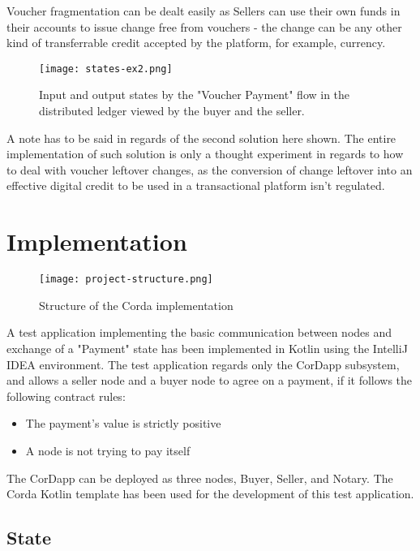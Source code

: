 Voucher fragmentation can be dealt easily as Sellers can use their own funds in their accounts to issue change free from vouchers - the change can be any other kind of transferrable credit accepted by the platform, for example, currency.

\begin{figure}[h!]
    \centering
    \texttt{[image: states-ex2.png]}
    \caption{
       Input and output states by the "Voucher Payment" flow in the distributed ledger viewed by the buyer and the seller.
        }
\end{figure}

A note has to be said in regards of the second solution here shown. The entire implementation of such solution is only a thought experiment in regards to how to deal with voucher leftover changes, as the conversion of change leftover into an effective digital credit to be used in a transactional platform isn't regulated.


\section{Implementation}

\begin{figure}[h!]
    \centering
    \texttt{[image: project-structure.png]}
    \caption{
       Structure of the Corda implementation
        }
\end{figure}

A test application implementing the basic communication between nodes and exchange of a "Payment" state has been implemented in Kotlin using the IntelliJ IDEA environment. The test application regards only the CorDapp subsystem, and allows a seller node and a buyer node to agree on a payment, if it follows the following contract rules: 

\begin{itemize}
    \item The payment's value is strictly positive
    \item A node is not trying to pay itself
\end{itemize}

The CorDapp can be deployed as three nodes, Buyer, Seller, and Notary.
The Corda Kotlin template has been used for the development of this test application.

\newpage

\subsection{State}


